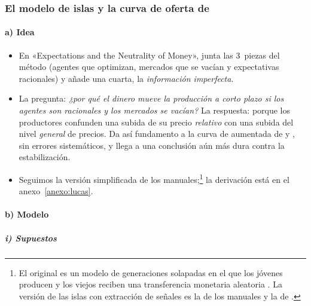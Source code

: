 \documentclass[11pt]{article}
\begin{document}
\subsubsection{El modelo de islas y la curva de oferta de }\label{sec:oferta-lucas}

\paragraph{a) Idea}

\begin{itemize}
\item En «Expectations and the Neutrality of Money», \textcite{Lucas1972Expectations} junta las 3~piezas del método (agentes que optimizan, mercados que se vacían y expectativas racionales) y añade una cuarta, la \emph{información imperfecta}.
\item La pregunta: \emph{¿por qué el dinero mueve la producción a corto plazo si los agentes son racionales y los mercados se vacían?} La respuesta: porque los productores confunden una subida de su precio \emph{relativo} con una subida del nivel \emph{general} de precios. Da así fundamento a la curva de  aumentada de  y  , sin errores sistemáticos, y llega a una conclusión aún más dura contra la estabilización.
\item Seguimos la versión simplificada de los manuales;\footnote{El original es un modelo de generaciones solapadas en el que los jóvenes producen y los viejos reciben una transferencia monetaria aleatoria . La versión de las islas con extracción de señales es la de los manuales y la de \textcite{AttfieldDemeryDuck1991}\nocite{Romer2019Advanced}.} la derivación está en el anexo~\ref{anexo:lucas}.
\end{itemize}

\paragraph{b) Modelo}

\subparagraph{i) Supuestos}
\end{document}
